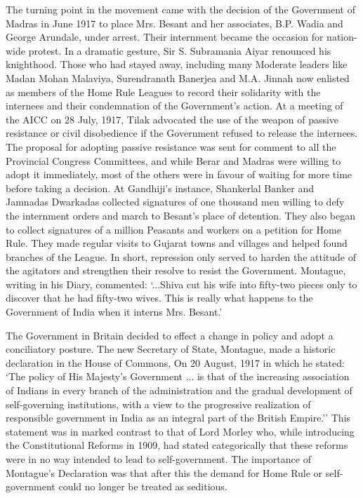 The turning point in the movement came with the decision of the Government of Madras in June 1917 to place Mrs. Besant and her associates, B.P. Wadia and George Arundale, under arrest. Their internment became the occasion for nation-wide protest. In a dramatic gesture, Sir S. Subramania Aiyar renounced his knighthood. Those who had stayed away, including many Moderate leaders like Madan Mohan Malaviya, Surendranath Banerjea and M.A. Jinnah now enlisted as members of the Home Rule Leagues to record their solidarity with the internees and their condemnation of the Government's action. At a meeting of the AICC on 28 July, 1917, Tilak advocated the use of the weapon of passive resistance or civil disobedience if the Government refused to release the internees. The proposal for adopting passive resistance was sent for comment to all the Provincial Congress Committees, and while Berar and Madras were willing to adopt it immediately, most of the others were in favour of waiting for more time before taking a decision. At Gandhiji's instance, Shankerlal Banker and Jamnadas Dwarkadas collected signatures of one thousand men willing to defy the internment orders and march to Besant's place of detention. They also began to collect signatures of a million Peasants and workers on a petition for Home Rule. They made regular visits to Gujarat towns and villages and helped found branches of the League. In short, repression only served to harden the attitude of the agitators and strengthen their resolve to resist the Government. Montague, writing in his Diary, commented: `...Shiva cut his wife into fifty-two pieces only to discover that he had fifty-two wives. This is really what happens to the Government of India when it interns Mrs. Besant.'

The Government in Britain decided to effect a change in policy and adopt a conciliatory posture. The new Secretary of State, Montague, made a historic declaration in the House of Commons, On 20 August, 1917 in which he stated: `The policy of His Majesty's Government ... is that of the increasing association of Indians in every branch of the administration and the gradual development of self-governing institutions, with a view to the progressive realization of responsible government in India as an integral part of the British Empire.'' This statement was in marked contrast to that of Lord Morley who, while introducing the Constitutional Reforms in 1909, had stated categorically that these reforms were in no way intended to lead to self-government. The importance of Montague's Declaration was that after this the demand for Home Rule or self- government could no longer be treated as seditious.

